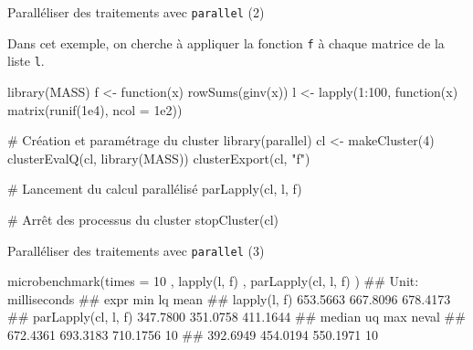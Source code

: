 \documentclass[12pt,handout,ignorenonframetext,]{beamer}
\newenvironment{Shaded}{}{}
\newcommand{\KeywordTok}[1]{\textcolor[rgb]{0.00,0.00,1.00}{{#1}}}
\newcommand{\DataTypeTok}[1]{{#1}}
\newcommand{\DecValTok}[1]{{#1}}
\newcommand{\FloatTok}[1]{{#1}}
\newcommand{\StringTok}[1]{\textcolor[rgb]{0.00,0.50,0.50}{{#1}}}
\newcommand{\CommentTok}[1]{\textcolor[rgb]{0.00,0.50,0.00}{{#1}}}
\newcommand{\NormalTok}[1]{{#1}}
\renewenvironment{Shaded}{\begin{snugshade}}{\end{snugshade}}
\begin{document}
\begin{frame}[fragile]{\large Paralléliser des traitements avec
\texttt{parallel} (2)}

Dans cet exemple, on cherche à appliquer la fonction \texttt{f} à chaque
matrice de la liste \texttt{l}.

\footnotesize

\begin{Shaded}
\begin{Highlighting}[]
\KeywordTok{library}\NormalTok{(MASS)}
\NormalTok{f <-}\StringTok{ }\NormalTok{function(x) }\KeywordTok{rowSums}\NormalTok{(}\KeywordTok{ginv}\NormalTok{(x))}
\NormalTok{l <-}\StringTok{ }\KeywordTok{lapply}\NormalTok{(}\DecValTok{1}\NormalTok{:}\DecValTok{100}\NormalTok{, function(x) }\KeywordTok{matrix}\NormalTok{(}\KeywordTok{runif}\NormalTok{(}\FloatTok{1e4}\NormalTok{), }\DataTypeTok{ncol =} \FloatTok{1e2}\NormalTok{))}

\CommentTok{# Création et paramétrage du cluster}
\KeywordTok{library}\NormalTok{(parallel)}
\NormalTok{cl <-}\StringTok{ }\KeywordTok{makeCluster}\NormalTok{(}\DecValTok{4}\NormalTok{)}
\KeywordTok{clusterEvalQ}\NormalTok{(cl, }\KeywordTok{library}\NormalTok{(MASS))}
\KeywordTok{clusterExport}\NormalTok{(cl, }\StringTok{"f"}\NormalTok{)}

\CommentTok{# Lancement du calcul parallélisé}
\KeywordTok{parLapply}\NormalTok{(cl, l, f)}

\CommentTok{# Arrêt des processus du cluster}
\KeywordTok{stopCluster}\NormalTok{(cl)}
\end{Highlighting}
\end{Shaded}

\end{frame}

\begin{frame}[fragile]{\large Paralléliser des traitements avec
\texttt{parallel} (3)}

\begin{Shaded}
\begin{Highlighting}[]
\KeywordTok{microbenchmark}\NormalTok{(}\DataTypeTok{times =} \DecValTok{10}
  \NormalTok{, }\KeywordTok{lapply}\NormalTok{(l, f)}
  \NormalTok{, }\KeywordTok{parLapply}\NormalTok{(cl, l, f)}
\NormalTok{)}
  \NormalTok{## Unit: milliseconds}
  \NormalTok{##                 expr      min       lq     mean}
  \NormalTok{##         lapply(l, f) 653.5663 667.8096 678.4173}
  \NormalTok{##  parLapply(cl, l, f) 347.7800 351.0758 411.1644}
  \NormalTok{##    median       uq      max neval}
  \NormalTok{##  672.4361 693.3183 710.1756    10}
  \NormalTok{##  392.6949 454.0194 550.1971    10}
\end{Highlighting}
\end{Shaded}

\end{frame}
\end{document}
